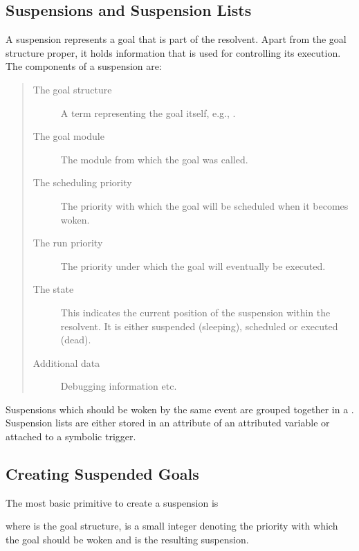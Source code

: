 
\subsection{Suspensions and Suspension Lists}
A suspension represents a goal that is part of the resolvent.
Apart from the goal structure proper, it holds information that
is used for controlling its execution.
The components of a suspension are:
\begin{quote}
\begin{description}
\item[The goal structure]
        A term representing the goal itself, e.g., .
\item[The goal module]
        The module from which the goal was called.
\item[The scheduling priority]
        The priority with which the goal will be scheduled when
        it becomes woken.
\item[The run priority]
        The priority under which the goal will eventually be executed.
\item[The state]
        This indicates the current position of the suspension within
        the resolvent. It is either suspended (sleeping), scheduled
	or executed (dead).
\item[Additional data]
	Debugging information etc.
\end{description}
\end{quote}

Suspensions which should be woken by the same event are grouped
together in a .
Suspension lists are either stored in an attribute of
an attributed variable or attached to a symbolic trigger.


\subsection{Creating Suspended Goals}
The most basic primitive to create a suspension is
\begin{quote}
%
\end{quote}
where  is the goal structure,
 is a small integer denoting the priority with which
the goal should be woken and  is the resulting suspension.

